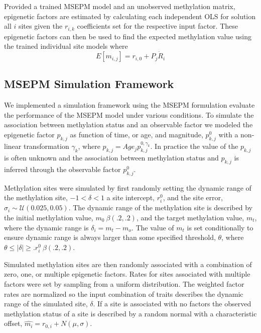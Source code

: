 \documentclass{article}
\begin{document}
{\begin{linenumbers}
Provided a trained MSEPM model and an unobserved methylation matrix, epigenetic factors are estimated by calculating each independent OLS for solution all $i$ 
sites given the $r_{i,k}$ coefficients set for the respective input factor.  These epigenetic factors can then be used to find the expected methylation value 
using the trained individual site models where $$E[m_{i,j}] = r_{i,0} + P_{j} \dot R_{i}$$

\subsection{MSEPM Simulation Framework}

We implemented a simulation framework using the MSEPM formulation evaluate the performance of the MSEPM model under various conditions.
To simulate the association between methylation status and an observable factor we modeled the 
epigenetic factor $p_{k,j}$ as function of time, or age, and magnitude, $p_{k,j}^0$ with a non-linear transformation $\gamma_{k}$, 
where $p_{k,j} = Age_j p_{k,j}^{0,\gamma_{k}}$. In practice the value of the $p_{k,j}$ is often unknown and the association between 
methylation status and $p_{k,j}$ is inferred through the observable factor $p_{k,j}^0$. 

Methylation sites were simulated by first randomly setting the dynamic range of the methylation site, 
$-1< \delta < 1$ a site intercept, $r^0_i$, and the site error, $\sigma_i \sim \mathcal{U}(0.025, 0.05)$. The dynamic 
range of the methylation site is described by the initial methylation value, $m_0 ~ \beta(.2,.2)$, 
and the target methylation value, $m_t$, where the dynamic range is $\delta_i = m_t - m_o$.
The value of $m_t$ is set conditionally to ensure dynamic range is always larger than some specified threshold, $\theta$, where 
$ \theta \leq|\delta| \geq. r^0_i ~ \beta(.2,.2)$.


Simulated methylation sites are then randomly associated with a combination of zero, one, or multiple epigenetic factors. Rates for sites 
associated with multiple factors were set by sampling from a uniform distribution. The weighted factor rates are normalized so 
the input combination of traits describes the dynamic range of the simulated site, $\delta$. If a site is associated 
with no factors the observed methylation status of a site is described by a random normal with a characteristic offset, $\hat{m_i} = r_{0,i} + N(\mu, \sigma)$.
 



\end{linenumbers}}
\end{document}

